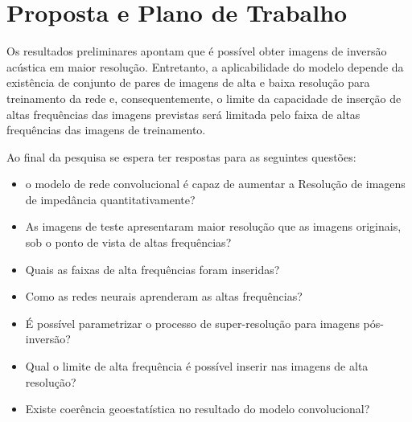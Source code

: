 % 
% 
% 




\section{Proposta e Plano de Trabalho}

Os resultados preliminares apontam que é possível obter imagens de
inversão acústica em maior resolução. Entretanto, a aplicabilidade
do modelo depende da existência de conjunto de pares de imagens
de alta e baixa resolução para treinamento da rede e, consequentemente,
o limite da capacidade de inserção de altas frequências das imagens previstas
será limitada pelo faixa de altas frequências das imagens de treinamento.

Ao final da pesquisa se espera ter respostas para as seguintes questões:
\begin{itemize}
 \item o modelo de rede convolucional é capaz de aumentar a Resolução de imagens de impedância
quantitativamente?
 \item As imagens de teste apresentaram maior resolução que as imagens originais, sob o ponto 
de vista de altas frequências?
 \item Quais as faixas de alta frequências foram inseridas?
 \item Como as redes neurais aprenderam as altas frequências?
 \item É possível parametrizar o processo de super-resolução para imagens pós-inversão?
 \item Qual o limite de alta frequência é possível inserir nas imagens de alta resolução?
 \item Existe coerência geoestatística no resultado do modelo convolucional?
\end{itemize}

